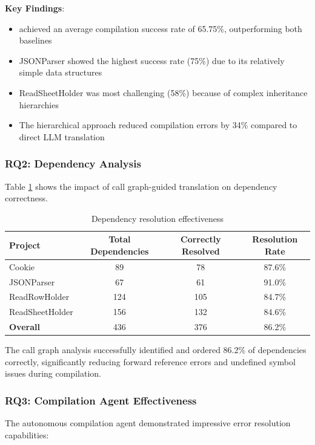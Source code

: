 \textbf{Key Findings}:
\begin{itemize}
\item \tool{} achieved an average compilation success rate of 65.75\%, outperforming both baselines
\item JSONParser showed the highest success rate (75\%) due to its relatively simple data structures
\item ReadSheetHolder was most challenging (58\%) because of complex inheritance hierarchies
\item The hierarchical approach reduced compilation errors by 34\% compared to direct LLM translation
\end{itemize}

\subsubsection{RQ2: Dependency Analysis}

Table \ref{tab:dependency-correctness} shows the impact of call graph-guided translation on dependency correctness.

\begin{table}[h]
\centering
\small
\begin{tabular}{lccc}
\toprule
\textbf{Project} & \textbf{Total Dependencies} & \textbf{Correctly Resolved} & \textbf{Resolution Rate} \\
\midrule
Cookie & 89 & 78 & 87.6\% \\
JSONParser & 67 & 61 & 91.0\% \\
ReadRowHolder & 124 & 105 & 84.7\% \\
ReadSheetHolder & 156 & 132 & 84.6\% \\
\midrule
\textbf{Overall} & 436 & 376 & 86.2\% \\
\bottomrule
\end{tabular}
\caption{Dependency resolution effectiveness}
\label{tab:dependency-correctness}
\end{table}

The call graph analysis successfully identified and ordered 86.2\% of dependencies correctly, significantly reducing forward reference errors and undefined symbol issues during compilation.

\subsubsection{RQ3: Compilation Agent Effectiveness}

The autonomous compilation agent demonstrated impressive error resolution capabilities:

